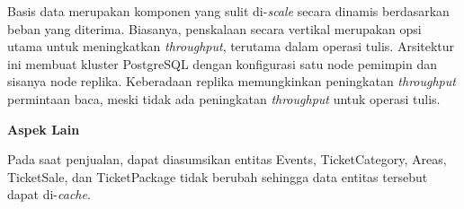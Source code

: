 Basis data merupakan komponen yang sulit di-\textit{scale} secara dinamis berdasarkan beban yang diterima. Biasanya, penskalaan secara vertikal merupakan opsi utama untuk meningkatkan \textit{throughput}, terutama dalam operasi tulis. Arsitektur ini membuat kluster PostgreSQL dengan konfigurasi satu node pemimpin dan sisanya node replika. Keberadaan replika memungkinkan peningkatan \textit{throughput} permintaan baca, meski tidak ada peningkatan \textit{throughput} untuk operasi tulis.

\textbf{Aspek Lain}

Pada saat penjualan, dapat diasumsikan entitas Events, TicketCategory, Areas, TicketSale, dan TicketPackage tidak berubah sehingga data entitas tersebut dapat di-\textit{cache}.